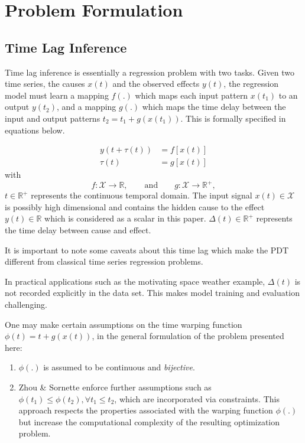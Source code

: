 \documentclass[envcountsect,runningheads]{llncs}
\theoremstyle{etoile}
\begin{document}
\section{Problem Formulation}\label{sec:formulation}

\subsection{Time Lag Inference}

Time lag inference is essentially a regression problem with two tasks. 
Given two time series, the causes $x(t)$ and the observed effects $y(t)$, the regression model 
must learn a mapping $f(.)$ which maps each input pattern $x(t_1)$ to an output $y(t_2)$, and a 
mapping $g(.)$ which maps the time delay between the input and output patterns $t_2 = t_1 + g(x(t_1))$. 
This is formally specified in equations below.

\begin{align}
y(t + \tau(t)) & = f[x(t)]\label{eq:pb1}\\
\tau(t) & = g[x(t)]\label{eq:pb2} 
\end{align}
with
\[
f: \mathcal{X}  \rightarrow \mathbb{R},\qquad\text{and}\qquad
g: \mathcal{X}  \rightarrow \mathbb{R}^{+},
\]
$t \in \mathbb{R}^{+}$ represents the continuous temporal domain. The input signal 
$x(t)\in \mathcal{X}$ is possibly high dimensional and contains the hidden cause to 
the effect $y(t)\in\mathbb{R}$ which is considered as a scalar in this paper. 
$\Delta(t)\in \mathbb{R}^+$ represents the time delay between cause and effect.

It is important to note some caveats about this time lag which make the PDT different from 
classical time series regression problems.

In practical applications such as the motivating space weather example, $\Delta(t)$ is not recorded 
explicitly in the data set. This makes model training and evaluation challenging.

One may make certain assumptions on the time warping function $\phi(t) = t + g(x(t))$, in the general 
formulation of the problem presented here: 

\begin{enumerate}
    \item $\phi(.)$ is assumed to be continuous and \emph{bijective}.
    \item Zhou \& Sornette \cite{ZHOU2006195} enforce further assumptions such as 
          $\phi(t_1) \leq \phi(t_2), \forall t_1 \leq t_2$, which are incorporated via constraints. 
          This approach respects the properties associated with the warping function $\phi(.)$ but 
          increase the computational complexity of the resulting optimization problem.
\end{enumerate}
\end{document}
